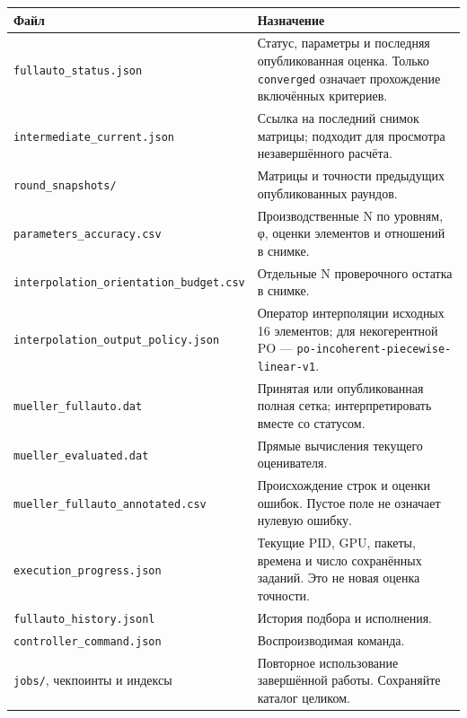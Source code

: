 \begin{longtable}[]{@{}
  >{\raggedright\arraybackslash}p{}
  >{\raggedright\arraybackslash}p{}@{}}
\toprule\noalign{}
\begin{minipage}[b]{\linewidth}\raggedright
Файл
\end{minipage} & \begin{minipage}[b]{\linewidth}\raggedright
Назначение
\end{minipage} \\
\midrule\noalign{}
\endhead
\bottomrule\noalign{}
\endlastfoot
\nolinkurl{fullauto_status.json} & Статус, параметры и последняя
опубликованная оценка. Только \texttt{converged} означает прохождение
включённых критериев. \\
\nolinkurl{intermediate_current.json} & Ссылка на последний снимок
матрицы; подходит для просмотра незавершённого расчёта. \\
\nolinkurl{round_snapshots/} & Матрицы и точности предыдущих
опубликованных раундов. \\
\nolinkurl{parameters_accuracy.csv} & Производственные N по уровням, φ,
оценки элементов и отношений в снимке. \\
\nolinkurl{interpolation_orientation_budget.csv} & Отдельные N
проверочного остатка в снимке. \\
\nolinkurl{interpolation_output_policy.json} & Оператор интерполяции
исходных 16 элементов; для некогерентной PO ---
\texttt{po-incoherent-piecewise-linear-v1}. \\
\nolinkurl{mueller_fullauto.dat} & Принятая или опубликованная полная
сетка; интерпретировать вместе со статусом. \\
\nolinkurl{mueller_evaluated.dat} & Прямые вычисления текущего
оценивателя. \\
\nolinkurl{mueller_fullauto_annotated.csv} & Происхождение строк и оценки
ошибок. Пустое поле не означает нулевую ошибку. \\
\nolinkurl{execution_progress.json} & Текущие PID, GPU, пакеты, времена и
число сохранённых заданий. Это не новая оценка точности. \\
\nolinkurl{fullauto_history.jsonl} & История подбора и исполнения. \\
\nolinkurl{controller_command.json} & Воспроизводимая команда. \\
\nolinkurl{jobs/}, чекпоинты и индексы & Повторное использование
завершённой работы. Сохраняйте каталог целиком. \\
\end{longtable}

